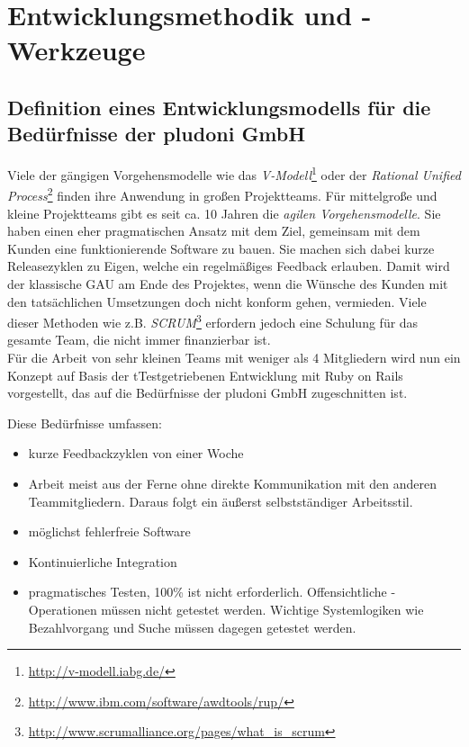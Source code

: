 \chapter{Entwicklungsmethodik und -Werkzeuge}
\label{sec:auswahl}
\section{Definition eines Entwicklungsmodells für die Bedürfnisse der pludoni GmbH}
Viele der gängigen Vorgehensmodelle wie das \textit{V-Modell}\footnote{\url{http://v-modell.iabg.de/}} oder der \textit{Rational Unified Process}\footnote{\url{http://www.ibm.com/software/awdtools/rup/}} finden ihre Anwendung in großen Projektteams. Für mittelgroße und kleine Projektteams gibt es seit ca. 10 Jahren die \textit{agilen Vorgehensmodelle}. Sie haben einen eher pragmatischen Ansatz mit dem Ziel, gemeinsam mit dem Kunden eine funktionierende Software zu bauen. Sie machen sich dabei kurze Releasezyklen zu Eigen, welche ein regelmäßiges Feedback erlauben. Damit wird der klassische GAU am Ende des Projektes, wenn die Wünsche des Kunden mit den tatsächlichen Umsetzungen doch nicht konform gehen, vermieden. Viele dieser Methoden wie z.B. \textit{SCRUM}\footnote{\url{http://www.scrumalliance.org/pages/what_is_scrum}} erfordern jedoch eine Schulung für das gesamte Team, die nicht immer finanzierbar ist.\\
Für die Arbeit von sehr kleinen Teams mit weniger als 4 Mitgliedern wird nun ein Konzept auf Basis der tTestgetriebenen Entwicklung mit Ruby on Rails vorgestellt, das auf die Bedürfnisse der pludoni GmbH zugeschnitten ist.

Diese Bedürfnisse umfassen:
\begin{itemize}
 \item kurze Feedbackzyklen von einer Woche
 \item Arbeit meist aus der Ferne ohne direkte Kommunikation mit den anderen Teammitgliedern. Daraus folgt ein äußerst selbstständiger Arbeitsstil.
 \item möglichst fehlerfreie Software
 \item Kontinuierliche Integration
 \item pragmatisches Testen, 100\%  ist nicht erforderlich. Offensichtliche -Operationen müssen nicht getestet werden.  Wichtige Systemlogiken wie Bezahlvorgang und Suche müssen dagegen getestet werden.
\end{itemize}

